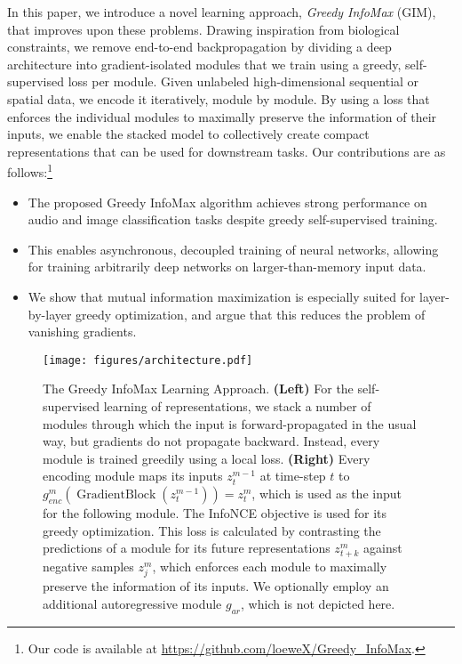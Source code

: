 \documentclass{article}
\newcommand{\ztk}{z_{t+k}}
\newcommand{\zt}{z_{t}}
\DeclareMathOperator{\gradblock}{GradientBlock}
\begin{document}
In this paper, we introduce a novel learning approach, \textit{Greedy InfoMax} (GIM), that improves upon these problems. Drawing inspiration from biological constraints, we remove end-to-end backpropagation by dividing a deep architecture into gradient-isolated modules that we train using a greedy, self-supervised loss per module. Given unlabeled high-dimensional sequential or spatial data, we encode it iteratively, module by module. By using a loss that enforces the individual modules to maximally preserve the information of their inputs, we enable the stacked model to collectively create compact representations that can be used for downstream tasks. Our contributions are as follows:\footnote[1]{Our code is available at \href{https://github.com/loeweX/Greedy_InfoMax}{https://github.com/loeweX/Greedy\_InfoMax}.}
\begin{itemize}
	\item
	The proposed Greedy InfoMax algorithm achieves strong performance on audio and image classification tasks despite greedy self-supervised training. 

	\item
	This enables asynchronous, decoupled training of neural networks, allowing for training arbitrarily deep networks on larger-than-memory input data.
	
    \item We show that mutual information maximization is especially suited for layer-by-layer greedy optimization, and argue that this reduces the problem of vanishing gradients.
    






\end{itemize}

\begin{figure*}[t!]
\centering
\texttt{[image: figures/architecture.pdf]}
    \caption{The Greedy InfoMax Learning Approach. \textbf{(Left)} For the self-supervised learning of representations, we stack a number of modules through which the input is forward-propagated in the usual way, but gradients do not propagate backward. Instead, every module is trained greedily using a local loss. \textbf{(Right)} Every encoding module maps its inputs $z_t^{m-1}$ at time-step $t$ to $g_{enc}^m(\gradblock(\zt^{m-1})) = z_t^{m}$, which is used as the input for the following module. The InfoNCE objective is used for its greedy optimization. This loss is calculated by contrasting the predictions of a module for its future representations $\ztk^m$ against negative samples $z_j^m$, which enforces each module to maximally preserve the information of its inputs. We optionally employ an additional autoregressive module $g_{ar}$, which is not depicted here.}
    \label{fig:infomax}
\end{figure*} 
\end{document}
